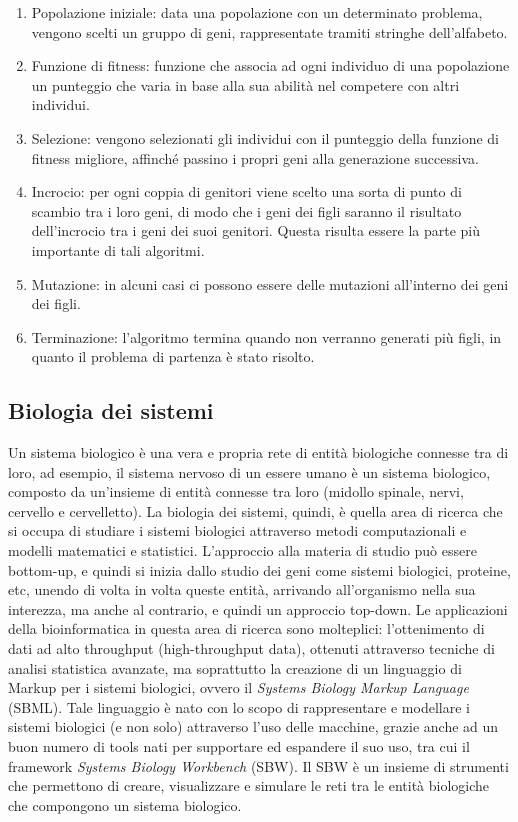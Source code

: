 \begin{enumerate}
	\item Popolazione iniziale: data una popolazione con un determinato problema, vengono scelti un gruppo di geni, rappresentate tramiti stringhe dell'alfabeto.
	\item Funzione di fitness: funzione che associa ad ogni individuo di una popolazione un punteggio che varia in base alla sua abilità nel competere con altri individui.
	\item Selezione: vengono selezionati gli individui con il punteggio della funzione di fitness migliore, affinché passino i propri geni alla generazione successiva.
	\item Incrocio: per ogni coppia di genitori viene scelto una sorta di punto di scambio tra i loro geni, di modo che i geni dei figli saranno il risultato dell'incrocio tra i geni dei suoi genitori. Questa risulta essere la parte più importante di tali algoritmi.
	\item Mutazione: in alcuni casi ci possono essere delle mutazioni all'interno dei geni dei figli.
	\item Terminazione: l'algoritmo termina quando non verranno generati più figli, in quanto il problema di partenza è stato risolto.
\end{enumerate}

\subsection{Biologia dei sistemi}
Un sistema biologico è una vera e propria rete di entità biologiche connesse tra di loro, ad esempio, il sistema nervoso di un essere umano è un sistema biologico, composto da un'insieme di entità connesse tra loro (midollo spinale, nervi, cervello e cervelletto).
\newline
La biologia dei sistemi, quindi, è quella area di ricerca che si occupa di studiare i sistemi biologici attraverso metodi computazionali e modelli matematici e statistici. L'approccio alla materia di studio può essere bottom-up, e quindi si inizia dallo studio dei geni come sistemi biologici, proteine, etc, unendo di volta in volta queste entità, arrivando all'organismo nella sua interezza, ma anche al contrario, e quindi un approccio top-down.
\newline
Le applicazioni della bioinformatica in questa area di ricerca sono molteplici: l'ottenimento di dati ad alto throughput (high-throughput data), ottenuti attraverso tecniche di analisi statistica avanzate, ma soprattutto la creazione di un linguaggio di Markup per i sistemi biologici, ovvero il \textit{Systems Biology Markup Language} (SBML)\cite{SBML}. Tale linguaggio è nato con lo scopo di rappresentare e modellare i sistemi biologici (e non solo) attraverso l'uso delle macchine, grazie anche ad un buon numero di tools nati per supportare ed espandere il suo uso, tra cui il framework \textit{Systems Biology Workbench} (SBW)\cite{SBW}. Il SBW è un insieme di strumenti che permettono di creare, visualizzare e simulare le reti tra le entità biologiche che compongono un sistema biologico.

